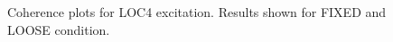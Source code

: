 \documentclass[paper=a4, fontsize=12pt]{scrartcl} %
\begin{document}
\begin{figure}[H]
{		\label{fig:LOC4R_wtWeight_coherance}
		}
		\caption{Coherence plots for LOC4 excitation. Results shown for FIXED and LOOSE condition.}
		\label{fig:LOC4CohFigs2}
	\end{figure}
%
%
\end{document}
